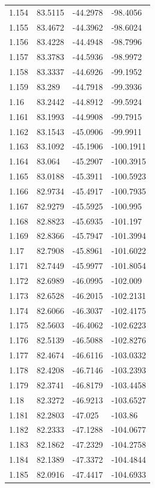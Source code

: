 \begin{tabular}{llll}
1.154 & 83.5115 & -44.2978 & -98.4056 \\
1.155 & 83.4672 & -44.3962 & -98.6024 \\
1.156 & 83.4228 & -44.4948 & -98.7996 \\
1.157 & 83.3783 & -44.5936 & -98.9972 \\
1.158 & 83.3337 & -44.6926 & -99.1952 \\
1.159 & 83.289 & -44.7918 & -99.3936 \\
1.16 & 83.2442 & -44.8912 & -99.5924 \\
1.161 & 83.1993 & -44.9908 & -99.7915 \\
1.162 & 83.1543 & -45.0906 & -99.9911 \\
1.163 & 83.1092 & -45.1906 & -100.1911 \\
1.164 & 83.064 & -45.2907 & -100.3915 \\
1.165 & 83.0188 & -45.3911 & -100.5923 \\
1.166 & 82.9734 & -45.4917 & -100.7935 \\
1.167 & 82.9279 & -45.5925 & -100.995 \\
1.168 & 82.8823 & -45.6935 & -101.197 \\
1.169 & 82.8366 & -45.7947 & -101.3994 \\
1.17 & 82.7908 & -45.8961 & -101.6022 \\
1.171 & 82.7449 & -45.9977 & -101.8054 \\
1.172 & 82.6989 & -46.0995 & -102.009 \\
1.173 & 82.6528 & -46.2015 & -102.2131 \\
1.174 & 82.6066 & -46.3037 & -102.4175 \\
1.175 & 82.5603 & -46.4062 & -102.6223 \\
1.176 & 82.5139 & -46.5088 & -102.8276 \\
1.177 & 82.4674 & -46.6116 & -103.0332 \\
1.178 & 82.4208 & -46.7146 & -103.2393 \\
1.179 & 82.3741 & -46.8179 & -103.4458 \\
1.18 & 82.3272 & -46.9213 & -103.6527 \\
1.181 & 82.2803 & -47.025 & -103.86 \\
1.182 & 82.2333 & -47.1288 & -104.0677 \\
1.183 & 82.1862 & -47.2329 & -104.2758 \\
1.184 & 82.1389 & -47.3372 & -104.4844 \\
1.185 & 82.0916 & -47.4417 & -104.6933 \\

\end{tabular}
